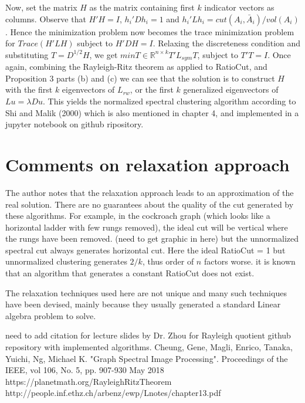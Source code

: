 \documentclass[10pt,a4paper, nocenter]{report}
\begin{document}
	Now, set the matrix $H$ as the matrix containing first $k$ indicator vectors as columns. Observe that $H'H=I$, $h_{i}'Dh_{i} = 1$ and $h_{i}'Lh_{i} = cut(A_{i},\bar{A}_{i})/vol(A_{i})$. Hence the minimization problem now becomes the trace minimization problem for $Trace(H'LH)$ subject to $H'DH=I$. Relaxing the discreteness condition and substituting $T = D^{1/2}H$, we get $min T\in \mathbb{R}^{n\times k}T'L_{sym}T$, subject to $T'T = I$. Once again, combining the Rayleigh-Ritz theorem as applied to RatioCut, and Proposition 3 parts (b) and (c) we can see that the solution is to construct $H$ with the first $k$ eigenvectors of $L_{rw}$, or the first $k$ generalized eigenvectors of $Lu=\lambda Du$. This yields the normalized spectral clustering algorithm according to Shi and Malik (2000) which is also mentioned in chapter 4, and implemented in a jupyter notebook on github ripository.
	 
	 \section{Comments on relaxation approach}
	 The author notes that the relaxation approach leads to an approximation of the real solution. There are no guarantees about the quality of the cut generated by these algorithms. For example, in the cockroach graph (which looks like a horizontal ladder with few rungs removed), the ideal cut will be vertical where the rungs have been removed. (need to get graphic in here) but the unnormalized spectral cut always generates horizontal cut. Here the ideal RatioCut = 1 but unnormalized clustering generates $2/k$, thus order of $n$ factors worse. it is known that an algorithm that generates a constant RatioCut does not exist. 
	 
	 The relaxation techniques used here are not unique and many such techniques have been devised, mainly because they usually generated a standard Linear algebra problem to solve. 
	
	\thispagestyle{fancy}
	\begin{thebibliography}{9}
	\thispagestyle{fancy}
		 need to add citation for lecture slides by Dr. Zhou for Rayleigh quotient 
		github repository with implemented algorithms. 
		Cheung, Gene, Magli, Enrico, Tanaka, Yuichi, Ng, Michael K. "Graph Spectral Image Processing". Proceedings of the IEEE, vol 106, No. 5, pp. 907-930 May 2018
		 https://planetmath.org/RayleighRitzTheorem
		 http://people.inf.ethz.ch/arbenz/ewp/Lnotes/chapter13.pdf

	\end{thebibliography}
\end{document}
